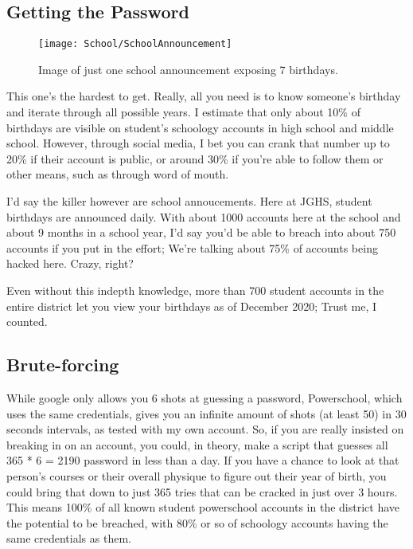 \subsection{Getting the Password}

\begin{figure}[h]
    \centering
    \texttt{[image: School/SchoolAnnouncement]}
    \caption{
        Image of just one school announcement exposing 7 birthdays.
    }
\end{figure}


This one's the hardest to get. Really, all you need is to know someone's birthday and iterate through all possible years. I estimate that only about 10\% of birthdays are visible on student's schoology accounts in high school and middle school. However, through social media, I bet you can crank that number up to 20\% if their account is public, or around 30\% if you're able to follow them or other means, such as through word of mouth.

I'd say the killer however are school annoucements. Here at JGHS, student birthdays are announced daily. With about 1000 accounts here at the school and about 9 months in a school year, I'd say you'd be able to breach into about 750 accounts if you put in the effort; We're talking about 75\% of accounts being hacked here. Crazy, right?

Even without this indepth knowledge, more than 700 student accounts in the entire district let you view your birthdays as of December 2020; Trust me, I counted.

\subsection{Brute-forcing}

While google only allows you 6 shots at guessing a password, Powerschool, which uses the same credentials, gives you an infinite amount of shots (at least 50) in 30 seconds intervals, as tested with my own account. So, if you are really insisted on breaking in on an account, you could, in theory, make a script that guesses all 365 * 6 = 2190 password in less than a day. If you have a chance to look at that person's courses or their overall physique to figure out their year of birth, you could bring that down to just 365 tries that can be cracked in just over 3 hours. This means 100\% of all known student powerschool accounts in the district have the potential to be breached, with 80\% or so of schoology accounts having the same credentials as them.

